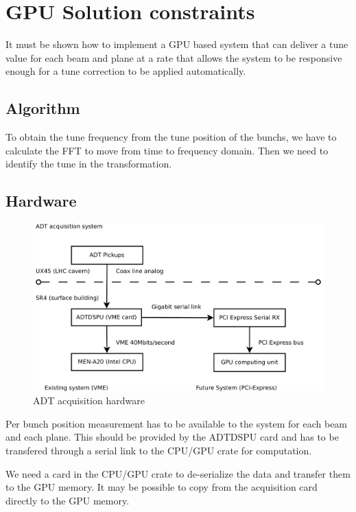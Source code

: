 \section{GPU Solution constraints}

It must be shown how to implement a GPU based system that can deliver a tune value for each beam and plane at a rate that allows the system to be responsive enough for a tune correction to be applied automatically.

\subsection{Algorithm}

To obtain the tune frequency from the tune position of the \glspl{bunch}, we have to calculate the FFT to move from time to frequency domain. Then we need to identify the tune in the transformation.

\subsection{Hardware}

\begin{figure}[H]
\caption{ADT acquisition hardware}
\centering
\includegraphics[scale=0.3]{acquisition.pdf}
\end{figure}

Per bunch position measurement has to be available to the system for each beam and each plane. This should be provided by the \gls{ADTDSPU} card and has to be transfered through a serial link to the CPU/GPU crate for computation.

We need a card in the CPU/GPU crate to de-serialize the data and transfer them to the GPU memory. It may be possible to copy from the acquisition card directly to the GPU memory.

